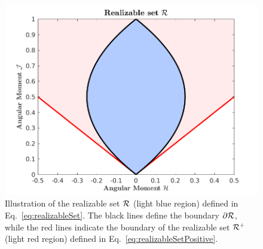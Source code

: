 \begin{figure}[h]
  \centering
  \includegraphics[width=1.0\linewidth]{figures/RealizableSetFermionic}
  \caption{Illustration of the realizable set $\mathcal{R}$ (light blue region) defined in Eq.~\eqref{eq:realizableSet}.  
  The black lines define the boundary $\partial\mathcal{R}$, while the red lines indicate the boundary of the realizable set $\mathcal{R}^{+}$ (light red region) defined in Eq.~\eqref{eq:realizableSetPositive}.}
  \label{fig:RealizableSetFermionic}
\end{figure}

